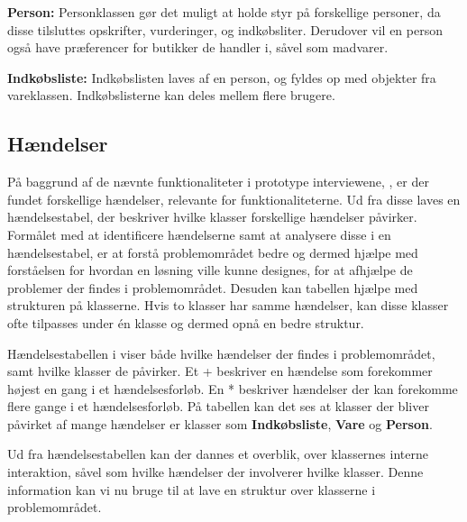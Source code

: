 \textbf{Person:}
Personklassen gør det muligt at holde styr på forskellige personer, da disse tilsluttes opskrifter, vurderinger, og indkøbsliter.
Derudover vil en person også have præferencer for butikker de handler i, såvel som madvarer.

\textbf{Indkøbsliste:}
Indkøbslisten laves af en person, og fyldes op med objekter fra vareklassen.
Indkøbslisterne kan deles mellem flere brugere.

\subsection{Hændelser}\label{handelser}
På baggrund af de nævnte funktionaliteter i prototype interviewene, , er der fundet forskellige hændelser, relevante for funktionaliteterne.
Ud fra disse laves en hændelsestabel, der beskriver hvilke klasser forskellige hændelser påvirker.
Formålet med at identificere hændelserne samt at analysere disse i en hændelsestabel, er at forstå problemområdet bedre og dermed hjælpe med forståelsen for hvordan en løsning ville kunne designes, for at afhjælpe de problemer der findes i problemområdet. Desuden kan tabellen hjælpe med strukturen på klasserne.
Hvis to klasser har samme hændelser, kan disse klasser ofte tilpasses under én klasse og dermed opnå en bedre struktur.



Hændelsestabellen i  viser både hvilke hændelser der findes i problemområdet, samt hvilke klasser de påvirker.
Et + beskriver en hændelse som forekommer højest en gang i et hændelsesforløb.
En * beskriver hændelser der kan forekomme flere gange i et hændelsesforløb.\citep{OOA&D2001}
På tabellen kan det ses at klasser der bliver påvirket af mange hændelser er klasser som \textbf{Indkøbsliste}, \textbf{Vare} og \textbf{Person}.

Ud fra hændelsestabellen kan der dannes et overblik, over klassernes interne interaktion, såvel som hvilke hændelser der involverer hvilke klasser.
Denne information kan vi nu bruge til at lave en struktur over klasserne i problemområdet.


